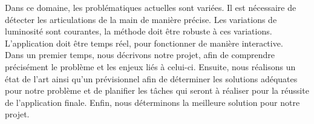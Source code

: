Dans ce domaine, les problématiques actuelles sont variées. Il est 
nécessaire de détecter les articulations de la main de manière précise. 
Les variations de luminosité sont courantes, la méthode doit être robuste 
à ces variations. L'application doit être temps réel, pour fonctionner de 
manière interactive.\\

Dans un premier temps, nous décrivons notre projet, afin de comprendre 
précisément le problème et les enjeux liés à celui-ci. Ensuite, nous 
réalisons un état de l'art ainsi qu'un prévisionnel afin de déterminer 
les solutions adéquates pour notre problème et de planifier les tâches 
qui seront à réaliser pour la réussite de l'application finale. Enfin, nous déterminons la meilleure solution pour notre projet.\\
